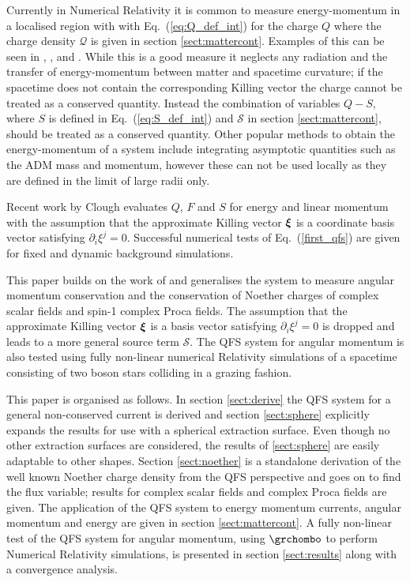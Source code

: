 Currently in Numerical Relativity it is common to measure energy-momentum in a localised region with with Eq.~(\ref{eq:Q_def_int}) for the charge $Q$ where the charge density $\mathcal{Q}$ is given in section \ref{sect:mattercont}. Examples of this can be seen in \cite{Sanchis_Gual_2019}, \cite{Di_Giovanni_2020},  \cite{PhysRevD.103.044059} and \cite{PhysRevD.96.024004}. While this is a good measure it neglects any radiation and the transfer of energy-momentum between matter and spacetime curvature; if the spacetime does not contain the corresponding Killing vector the charge cannot be treated as a conserved quantity. Instead the combination of variables $Q-S$, where $S$ is defined in Eq.~(\ref{eq:S_def_int}) and $\mathcal{S}$ in section \ref{sect:mattercont}, should be treated as a conserved quantity. Other popular methods to obtain the energy-momentum of a system include integrating asymptotic quantities such as the ADM mass and momentum, however these can not be used locally as they are defined in the limit of large radii only.

Recent work by Clough \cite{Clough_2021} evaluates $Q$, $F$ and $S$ for energy and linear momentum with the assumption that the approximate Killing vector $\boldsymbol{\xi}$ is a coordinate basis vector satisfying ${\partial_i \xi^j} =0$. Successful numerical tests of Eq.~(\ref{first_qfs}) are given for fixed and dynamic background simulations.

This paper builds on the work of \cite{Clough_2021} and generalises the system to measure angular momentum conservation and the conservation of Noether charges of complex scalar fields and spin-1 complex Proca fields. The assumption that the approximate Killing vector $\boldsymbol{\xi}$ is a basis vector satisfying $\partial_i \xi^j = 0$ is dropped and leads to a more general source term $\mathcal{S}$. The QFS system for angular momentum is also tested using fully non-linear numerical Relativity simulations of a spacetime consisting of two boson stars colliding in a grazing fashion.

This paper is organised as follows. In section \ref{sect:derive} the QFS system for a general non-conserved current is derived and section \ref{sect:sphere} explicitly expands the results for use with a spherical extraction surface. Even though no other extraction surfaces are considered, the results of \ref{sect:sphere} are easily adaptable  to other shapes. Section \ref{sect:noether} is a standalone derivation of the well known Noether charge density from the QFS perspective and goes on to find the flux variable; results for complex scalar fields and complex Proca fields are given. The application of the QFS system to energy momentum currents, angular momentum and energy are given in section \ref{sect:mattercont}. A fully non-linear test of the QFS system for angular momentum, using $\grchombo$ \cite{clough2015grchombo,Andrade2021} to perform Numerical Relativity simulations, is presented in section \ref{sect:results} along with a convergence analysis.











